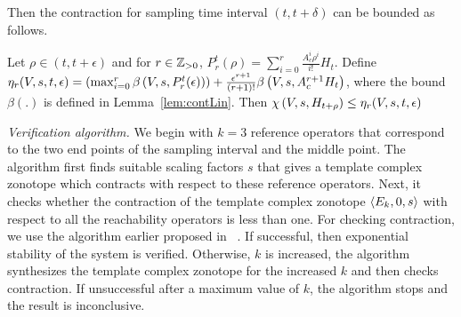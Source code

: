 Then the contraction for sampling time interval $(t,t+\delta)$ can be
bounded %
as follows.
%
\begin{thm}\label{thm:expbound}
  Let $\rho\in (t,t+\epsilon)$ and for $r\in\mathbb{Z}_{>0}$, $
  P^t_r(\rho)=\sum_{i=0}^r\frac{A_c^i\rho^i}{i!}H_t$.  Define
  $\eta_r(V,s,t,\epsilon)=
  \left(\max_{i=0}^r\beta\left(V,s,P^t_r(\epsilon)\right)\right)+
  \frac{\epsilon^{r+1}}{(r+1)!}\beta\left(V,s,A_c^{r+1}H_t\right)$, where
  the bound $\beta(.)$ is defined in Lemma~\ref{lem:contLin}.  Then
  $\chi\left(V,s,H_{t+\rho}\right)\leq \eta_r(V,s,t,\epsilon) $
\end{thm}
%




\emph{Verification algorithm.} We begin with $k=3$ reference operators
that correspond to the two end points of the sampling interval and the
middle point.  The algorithm first finds suitable scaling factors $s$
that gives a template complex zonotope which contracts with respect to
these reference operators.  Next, it checks whether the contraction of
the template complex zonotope $\left<E_k,0,s\right>$ with respect to all the
reachability operators is less than one. For checking contraction, we
use the algorithm earlier proposed in ~\cite{arvind2016lis}.  If
successful, then exponential stability of the system is verified.
Otherwise, $k$ is increased, the algorithm synthesizes the template
complex zonotope for the increased $k$ and then checks contraction. If
unsuccessful after a maximum value of $k$, the algorithm stops and the
result is inconclusive.  %




